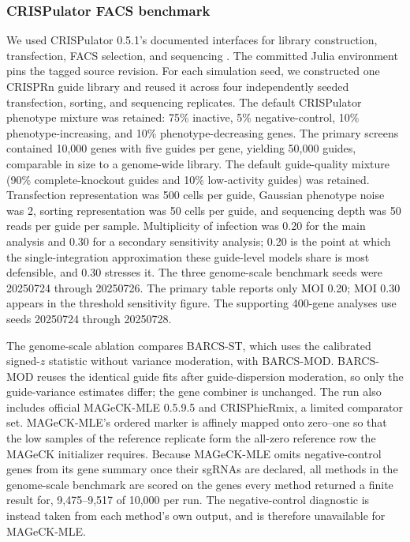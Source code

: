 \subsubsection{CRISPulator FACS benchmark}

We used CRISPulator 0.5.1's documented interfaces for library construction,
transfection, FACS selection, and sequencing \citep{nagy2017crispulator}. The
committed Julia environment pins the tagged source revision.  For each
simulation seed, we constructed one CRISPRn guide library and reused it across
four independently seeded transfection, sorting, and sequencing replicates.
The default CRISPulator phenotype mixture was retained: 75\% inactive, 5\%
negative-control, 10\% phenotype-increasing, and 10\% phenotype-decreasing
genes.  The primary screens contained 10,000 genes with five guides per gene,
yielding 50,000 guides, comparable in size to a genome-wide library.  The
default guide-quality mixture (90\% complete-knockout guides and 10\%
low-activity guides) was retained. Transfection representation was 500 cells
per guide, Gaussian phenotype noise was 2, sorting representation was 50 cells
per guide, and sequencing depth was 50 reads per guide per sample.
Multiplicity of infection was 0.20 for the main analysis and 0.30 for a
secondary sensitivity analysis; 0.20 is the point at which the
single-integration approximation these guide-level models share is most
defensible, and 0.30 stresses it.  The three genome-scale benchmark seeds were
20250724 through 20250726.  The primary table reports only MOI 0.20; MOI 0.30
appears in the threshold sensitivity figure.  The supporting 400-gene analyses
use seeds 20250724 through 20250728.

The genome-scale ablation compares BARCS-ST, which uses the calibrated
signed-$z$ statistic without variance moderation, with BARCS-MOD.  BARCS-MOD
reuses the identical guide fits after guide-dispersion moderation, so only the
guide-variance estimates differ; the gene combiner is unchanged. The run also
includes official MAGeCK-MLE 0.5.9.5 and CRISPhieRmix, a limited comparator
set. MAGeCK-MLE's ordered marker is affinely mapped onto zero--one so that the
low samples of the reference replicate form the all-zero reference row the
MAGeCK initializer requires. Because MAGeCK-MLE omits negative-control genes
from its gene summary once their sgRNAs are declared, all methods in the
genome-scale benchmark are scored on the genes every method returned a finite
result for, 9,475--9,517 of 10,000 per run.  The negative-control diagnostic
is instead taken from each method's own output, and is therefore unavailable
for MAGeCK-MLE.

